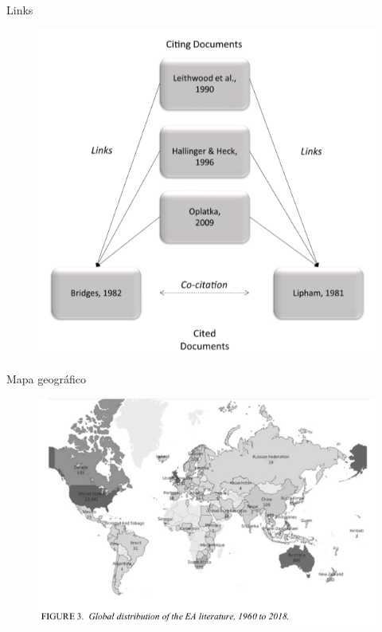 \begin{frame}{Links}
\begin{figure}
\centering
\includegraphics[scale=0.35]{figs/03/exemplo-1-2}
\end{figure}
\end{frame}

\begin{frame}{Mapa geográfico}
\begin{figure}
\centering
\includegraphics[scale=0.45]{figs/03/exemplo-1-3}
\end{figure}
\end{frame}

